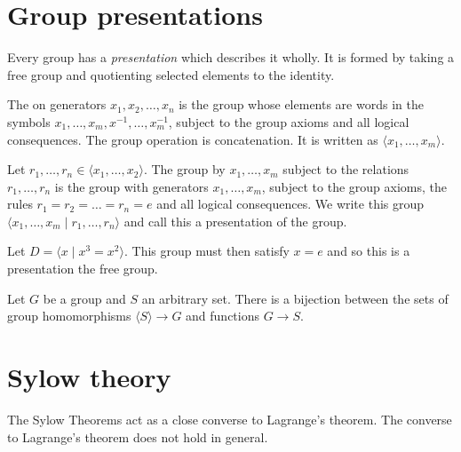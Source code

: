 \section{Group presentations}
\label{sec:group-theory:group-presentations}

Every group has a \textit{presentation} which describes it wholly.
%
It is formed by taking a free group and quotienting selected elements to the identity.

\begin{definition}\label{def:group-theory:free-group}
  The  on generators \(x_{1}, x_{2}, \ldots, x_{n}\) is the group whose elements are words in the symbols \(x_{1}, \ldots, x_{m},x^{-1}, \ldots, x^{-1}_{m}\), subject to the group axioms and all logical consequences.
  The group operation is concatenation.
  It is written as \(\langle x_{1}, \ldots, x_{m} \rangle\).
\end{definition}

\begin{definition}
 \label{def:group-theory:generated-by-subject-to-relations}
 Let \(r_{1}, \ldots, r_{n} \in \langle x_{1}, \ldots, x_{2} \rangle\).
 The group  by \(x_{1}, \ldots, x_{m}\) subject to the relations \(r_{1}, \ldots, r_{n}\) is the group with generators \(x_{1}, \ldots, x_{m}\), subject to the group axioms, the rules \(r_{1} = r_{2}= \ldots = r_{n} = e\) and all logical consequences.
 We write this group \(\langle x_{1}, \ldots, x_{m} \mid r_{1}, \ldots, r_{n} \rangle\) and call this a presentation of the group.
\end{definition}

\begin{example}
  Let \(D = \langle x \mid x^{3} = x^{2} \rangle\).
  This group must then satisfy \(x=e\) and so this is a presentation the free group.
\end{example}

\begin{theorem}
  \label{thm:group-theory:universal-property-of-free-groups}
  Let \(G\) be a group and \(S\) an arbitrary set.
  There is a bijection between the sets of group homomorphisms \(\langle S \rangle \to G\) and functions \(G \to S\).
\end{theorem}



\section{Sylow theory}
The Sylow Theorems act as a close converse to Lagrange's theorem. The converse to Lagrange's theorem does not hold in general.


